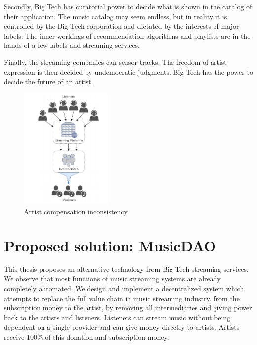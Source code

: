 Secondly, Big Tech has curatorial power to decide what is shown in the catalog of their application. The music catalog may seem endless, but in reality it is controlled by the Big Tech corporation and dictated by the interests of major labels. The inner workings of recommendation algorithms and playlists are in the hands of a few labels and streaming services.

Finally, the streaming companies can sensor tracks. The freedom of artist expression is then decided by undemocratic judgments. Big Tech has the power to decide the future of an artist.

\begin{figure}
    \centering
	\includegraphics[width=0.4\textwidth]{introduction/problem-image.png}
	\caption{Artist compensation inconsistency}
\end{figure}

\section{Proposed solution: MusicDAO}
This thesis proposes an alternative technology from Big Tech streaming services. We observe that most functions of music streaming systems are already completely automated.
We design and implement a decentralized system which attempts to replace the full value chain in music streaming industry, from the subscription money to the artist, by removing all intermediaries and giving power back to the artists and listeners. Listeners can stream music without being dependent on a single provider and can give money directly to artists. Artists receive 100\% of this donation and subscription money.

